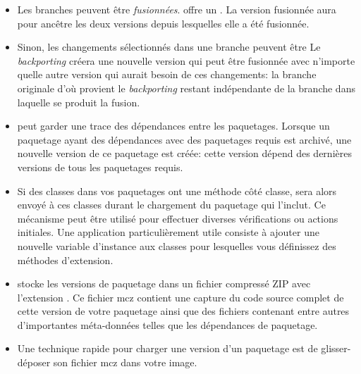 \documentclass[a4paper,10pt,twoside]{book}
\begin{document}
\begin{itemize}
\item Les branches peuvent être  \emph{fusionnées}. \MC offre un
  . %
La version fusionnée aura pour ancêtre les deux versions depuis
lesquelles elle a été fusionnée.

\item Sinon, les changements sélectionnés dans une branche peuvent
  être  Le \emph{backporting} %
créera une nouvelle version qui peut être fusionnée avec n'importe
quelle autre version qui aurait besoin de ces changements: la branche
originale d'où provient le \emph{backporting} restant indépendante de
la branche dans laquelle se produit la fusion.

\item \MC peut garder une trace des dépendances entre les
  paquetages. Lorsque un paquetage ayant des dépendances avec des
  paquetages requis est archivé, une nouvelle version de ce paquetage
  est créée: cette version dépend des dernières versions de tous les
  paquetages requis. 

\item Si des classes dans vos paquetages ont une méthode
   côté classe,  sera alors envoyé à ces
  classes durant le chargement du paquetage qui l'inclut.
Ce mécanisme peut être utilisé pour effectuer diverses vérifications
ou actions initiales. %
Une application particulièrement utile consiste à ajouter une nouvelle
variable d'instance aux classes pour lesquelles vous définissez des
méthodes d'extension.

\item \MC stocke les versions de paquetage dans un fichier compressé
  ZIP avec l'extension . Ce fichier mcz contient une capture
  du code source complet de cette version de votre paquetage ainsi que
  des fichiers contenant entre autres d'importantes méta-données
  telles que les dépendances de paquetage.

\item Une technique rapide pour charger une version d'un paquetage est de
  glisser-déposer son fichier mcz dans votre image.



\end{itemize}
\end{document}
